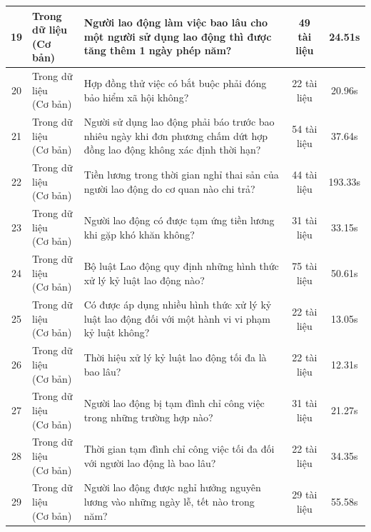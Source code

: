 \begin{longtable}{|c|l|p{6.5cm}|c|c|}
19 & \makecell[l]{Trong dữ liệu\\(Cơ bản)} & Người lao động làm việc bao lâu cho một người sử dụng lao động thì được tăng thêm 1 ngày phép năm? & 49 tài liệu & 24.51s \\ \hline
20 & \makecell[l]{Trong dữ liệu\\(Cơ bản)} & Hợp đồng thử việc có bắt buộc phải đóng bảo hiểm xã hội không? & 22 tài liệu & 20.96s \\ \hline
21 & \makecell[l]{Trong dữ liệu\\(Cơ bản)} & Người sử dụng lao động phải báo trước bao nhiêu ngày khi đơn phương chấm dứt hợp đồng lao động không xác định thời hạn? & 54 tài liệu & 37.64s \\ \hline
22 & \makecell[l]{Trong dữ liệu\\(Cơ bản)} & Tiền lương trong thời gian nghỉ thai sản của người lao động do cơ quan nào chi trả? & 44 tài liệu & 193.33s \\ \hline
23 & \makecell[l]{Trong dữ liệu\\(Cơ bản)} & Người lao động có được tạm ứng tiền lương khi gặp khó khăn không? & 31 tài liệu & 33.15s \\ \hline
24 & \makecell[l]{Trong dữ liệu\\(Cơ bản)} & Bộ luật Lao động quy định những hình thức xử lý kỷ luật lao động nào? & 75 tài liệu & 50.61s \\ \hline
25 & \makecell[l]{Trong dữ liệu\\(Cơ bản)} & Có được áp dụng nhiều hình thức xử lý kỷ luật lao động đối với một hành vi vi phạm kỷ luật không? & 22 tài liệu & 13.05s \\ \hline
26 & \makecell[l]{Trong dữ liệu\\(Cơ bản)} & Thời hiệu xử lý kỷ luật lao động tối đa là bao lâu? & 22 tài liệu & 12.31s \\ \hline
27 & \makecell[l]{Trong dữ liệu\\(Cơ bản)} & Người lao động bị tạm đình chỉ công việc trong những trường hợp nào? & 31 tài liệu & 21.27s \\ \hline
28 & \makecell[l]{Trong dữ liệu\\(Cơ bản)} & Thời gian tạm đình chỉ công việc tối đa đối với người lao động là bao lâu? & 22 tài liệu & 34.35s \\ \hline
29 & \makecell[l]{Trong dữ liệu\\(Cơ bản)} & Người lao động được nghỉ hưởng nguyên lương vào những ngày lễ, tết nào trong năm? & 29 tài liệu & 55.58s \\ \hline

\end{longtable}

